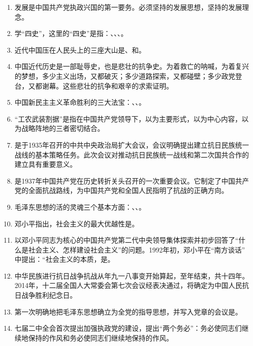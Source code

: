 \documentclass[UTF8,11pt,a4paper]{ctexart}
\begin{document}
\begin{enumerate}[label=\textbf{\arabic*.}, leftmargin=2.5em, itemsep=0.5em]
\item 发展是中国共产党执政兴国的第一要务。必须坚持的发展思想，坚持的发展理念。
\item 学“四史”，这里的“四史”是指：、、、。
\item 近代中国压在人民头上的三座大山是、和。
\item 中国近代历史是一部耻辱史，也是悲壮的抗争史。为着救亡的呐喊，为着复兴的梦想，多少主义出场，又都破灭；多少道路探索，又都碰壁；多少政党登台，又都谢幕。这些悲壮的抗争和艰辛的求索证明。
\item 中国新民主主义革命胜利的三大法宝：、、。
\item “工农武装割据”是指在中国共产党领导下，以为主要形式，以为中心内容，以为战略阵地的三者密切结合。
\item {}是于1935年召开的中共中央政治局扩大会议，会议明确提出建立抗日民族统一战线的基本策略任务。此次会议对推动抗日民族统一战线和第二次国共合作的建立具有重要意义。
\item {}是1937年中国共产党在历史转折关头召开的一次重要会议。它制定了中国共产党的全面抗战路线，为中国共产党和全国人民指明了抗战的正确方向。
\item 毛泽东思想的活的灵魂三个基本方面：、、。
\item 邓小平指出，社会主义的最大优越性是。
\item 以邓小平同志为核心的中国共产党第二代中央领导集体探索并初步回答了“什么是社会主义、怎样建设社会主义”的问题。1992年初，邓小平在“南方谈话” 中提出：“社会主义的本质，是。
\item 中华民族进行抗日战争抗战从年九一八事变开始算起，至年结束，共十四年。2014年，十二届全国人大常委会第七次会议经表决通过，将确定为中国人民抗日战争胜利纪念日。
\item 第一次明确地把毛泽东思想确立为全党的指导思想，并写入党章的会议是。
\item 七届二中全会首次提出加强执政党的建设，提出“两个务必”：务必使同志们继续地保持的作风和务必使同志们继续地保持的作风。

\end{enumerate}
\end{document}
